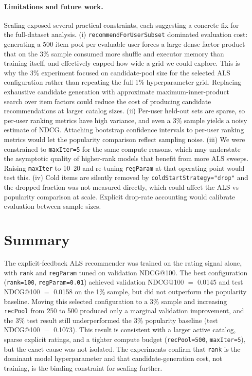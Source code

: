 \documentclass[10pt,twocolumn]{article}
\begin{document}
\paragraph{Limitations and future work.} Scaling exposed several practical constraints, each suggesting a concrete fix for the full-dataset analysis. (i) \texttt{recommendForUserSubset} dominated evaluation cost: generating a 500-item pool per evaluable user forces a large dense factor product that on the 3\% sample consumed more shuffle and executor memory than training itself, and effectively capped how wide a grid we could explore. This is why the 3\% experiment focused on candidate-pool size for the selected ALS configuration rather than repeating the full 1\% hyperparameter grid. Replacing exhaustive candidate generation with approximate maximum-inner-product search over item factors could reduce the cost of producing candidate recommendations at larger catalog sizes. (ii) Per-user held-out sets are sparse, so per-user ranking metrics have high variance, and even a 3\% sample yields a noisy estimate of NDCG. Attaching bootstrap confidence intervals to per-user ranking metrics would let the popularity comparison reflect sampling noise. (iii) We were constrained to \texttt{maxIter=5} for the same compute reasons, which may understate the asymptotic quality of higher-rank models that benefit from more ALS sweeps. Raising \texttt{maxIter} to 10--20 and re-tuning \texttt{regParam} at that operating point would test this. (iv) Cold items are silently removed by \texttt{coldStartStrategy="drop"} and the dropped fraction was not measured directly, which could affect the ALS-vs-popularity comparison at scale. Explicit drop-rate accounting would calibrate evaluation between sample sizes.

\section{Summary}
The explicit-feedback ALS recommender was trained on the rating signal alone, with \texttt{rank} and \texttt{regParam} tuned on validation NDCG@100. The best configuration (\texttt{rank=100}, \texttt{regParam=0.01}) achieved validation NDCG@100 $=$ 0.0145 and test NDCG@100 $=$ 0.0158 on the 1\% sample, but did not outperform the popularity baseline. Moving this selected configuration to a 3\% sample and increasing \texttt{recPool} from 250 to 500 produced only a marginal validation improvement, and the 3\% test result still underperformed the 3\% popularity baseline (test NDCG@100 $=$ 0.1073). This result is consistent with a larger active catalog, sparse explicit ratings, and a tighter compute budget (\texttt{recPool=500}, \texttt{maxIter=5}), but the exact cause was not isolated. The experiments confirm that \texttt{rank} is the dominant model hyperparameter and that candidate-generation cost, not training, is the binding constraint for scaling further.
\end{document}
